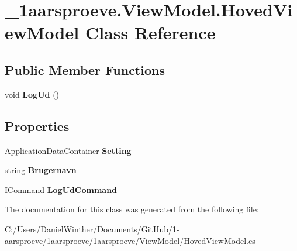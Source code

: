\hypertarget{class__1aarsproeve_1_1_view_model_1_1_hoved_view_model}{}\section{\+\_\+1aarsproeve.\+View\+Model.\+Hoved\+View\+Model Class Reference}
\label{class__1aarsproeve_1_1_view_model_1_1_hoved_view_model}
\subsection*{Public Member Functions}
\begin{DoxyCompactItemize}
\item 
\hypertarget{class__1aarsproeve_1_1_view_model_1_1_hoved_view_model_ab9eeed2082ee607e4243559b1750eb8e}{}void {\bfseries Log\+Ud} ()\label{class__1aarsproeve_1_1_view_model_1_1_hoved_view_model_ab9eeed2082ee607e4243559b1750eb8e}

\end{DoxyCompactItemize}
\subsection*{Properties}
\begin{DoxyCompactItemize}
\item 
\hypertarget{class__1aarsproeve_1_1_view_model_1_1_hoved_view_model_afbb2eb2f33bdb6defe9979b80c6e79ff}{}Application\+Data\+Container {\bfseries Setting}\label{class__1aarsproeve_1_1_view_model_1_1_hoved_view_model_afbb2eb2f33bdb6defe9979b80c6e79ff}

\item 
\hypertarget{class__1aarsproeve_1_1_view_model_1_1_hoved_view_model_a48f0c876a1e3cd598fe3c4c7c65a760d}{}string {\bfseries Brugernavn}\label{class__1aarsproeve_1_1_view_model_1_1_hoved_view_model_a48f0c876a1e3cd598fe3c4c7c65a760d}

\item 
\hypertarget{class__1aarsproeve_1_1_view_model_1_1_hoved_view_model_ae541527e8e9063cc3337b229b93c7e48}{}I\+Command {\bfseries Log\+Ud\+Command}\label{class__1aarsproeve_1_1_view_model_1_1_hoved_view_model_ae541527e8e9063cc3337b229b93c7e48}

\end{DoxyCompactItemize}


The documentation for this class was generated from the following file\+:\begin{DoxyCompactItemize}
\item 
C\+:/\+Users/\+Daniel\+Winther/\+Documents/\+Git\+Hub/1-\/aarsproeve/1aarsproeve/1aarsproeve/\+View\+Model/Hoved\+View\+Model.\+cs\end{DoxyCompactItemize}
